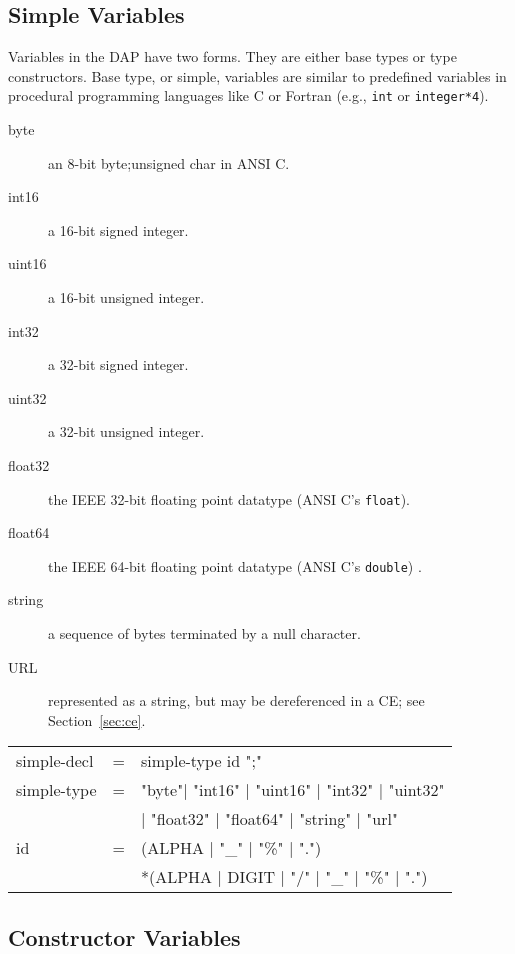 \subsection{Simple Variables}
\label{simple-variables}

Variables in the \ac{DAP} have two forms. They are either base types or type
constructors. Base type, or simple, variables are similar to predefined
variables in procedural programming languages like C or Fortran (e.g.,
\texttt{int} or \texttt{integer*4}).

\begin{description}
\item [byte] an 8-bit byte;unsigned char in ANSI C\@.
\item [int16] a 16-bit signed integer.
\item [uint16] a 16-bit unsigned integer.
\item [int32] a 32-bit signed integer.
\item [uint32] a 32-bit unsigned integer.
\item [float32] the IEEE 32-bit floating point datatype (ANSI C's
  \texttt{float}). 
\item [float64] the IEEE 64-bit floating point datatype (ANSI C's
  \texttt{double}) .
\item [string] a sequence of bytes terminated by a null character.
\item [URL] represented as a string, but may be dereferenced in a \ac{CE};
  see Section~\ref{sec:ce}.
\end{description}

\begin{ttfamily}
\begin{center}
\begin{tabular}{lll}
simple-decl & = & simple-type id ";" \\
simple-type & = & "byte"| "int16" | "uint16" | "int32" | "uint32" \\
                & & | "float32" | "float64" | "string" | "url" \\
id & = & (ALPHA | "\_" | "\%" | ".") \\
       & & *(ALPHA | DIGIT | "/" | "\_" | "\%" | ".") \\
\end{tabular}
\end{center}
\end{ttfamily}

\subsection{Constructor Variables} 
\label{sec:ctor-vars}

